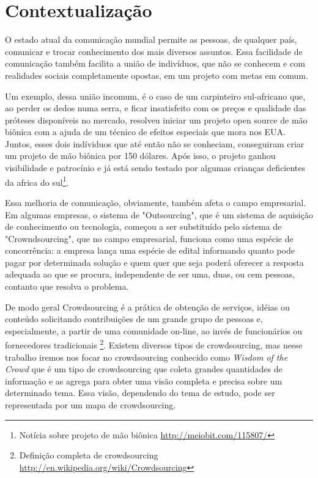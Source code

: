 \section{Contextualização}
O estado atual da comunicação mundial permite as pessoas, de qualquer país, comunicar e trocar conhecimento dos mais diversos assuntos. Essa facilidade de comunicação também facilita a união de indivíduos, que não se conhecem e com realidades sociais completamente opostas, em um projeto com metas em comum.

Um exemplo, dessa união incomum, é o caso de um carpinteiro sul-africano que, ao perder os dedos numa serra, e ficar insatisfeito com os preços e qualidade das próteses disponíveis no mercado, resolveu iniciar um projeto open source de mão biônica com a ajuda de um técnico de efeitos especiais que mora nos EUA. Juntos, esses dois indíviduos que até então não se conheciam, conseguiram criar um projeto de mão biônica por 150 dólares. Após isso, o projeto ganhou visibilidade e patrocínio e já está sendo testado por algumas crianças deficientes da africa do sul\footnote{\label{maobionica} Notícia sobre projeto de mão biônica \url{http://meiobit.com/115807/}}.

Essa melhoria de comunicação, obviamente, também  afeta o campo empresarial. Em algumas empresas, o sistema de "Outsourcing", que é um sistema de aquisição de conhecimento ou tecnologia, começou a ser substituído pelo sistema de "Crowndsourcing", que no campo empresarial, funciona como uma espécie de concorrência: a empresa lança uma espécie de edital informando quanto pode pagar por determinada solução e quem quer que seja poderá oferecer a resposta adequada ao que se procura, independente de ser uma, duas, ou cem pessoas, contanto que resolva o problema.

De modo geral Crowdsourcing é a prática de obtenção de serviços, idéias ou conteúdo solicitando contribuições de um grande grupo de pessoas e, especialmente, a partir de uma comunidade on-line, ao invés de funcionários ou fornecedores tradicionais \footnote{\label{wiki-crowd} Definição completa de crowdsourcing \url{ http://en.wikipedia.org/wiki/Crowdsourcing}}.
Existem diversos tipos de crowdsourcing, mas nesse trabalho iremos nos focar no crowdsourcing conhecido como \emph{Wisdom of the Crowd} que é um tipo de crowdsourcing que coleta grandes quantidades de informação e as agrega para obter uma visão completa e precisa sobre um determinado tema. Essa visão, dependendo do tema de estudo, pode ser representada por um mapa de crowdsourcing.

